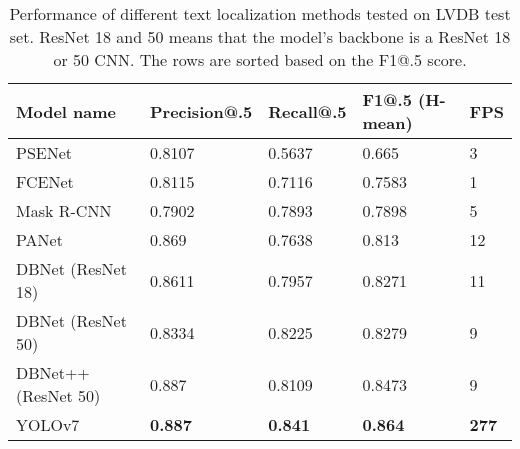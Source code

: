 \begin{table}[!ht]
    \centering
    \caption{Performance of different text localization methods tested on LVDB test set. ResNet 18 and 50 means that the model's backbone is a ResNet 18 or 50 CNN. The rows are sorted based on the F1@.5 score.}
    \begin{tabular}{|l|l|l|l|l|}
    \hline
        Model name & Precision@.5 & Recall@.5 & F1@.5 (H-mean) & FPS \\ \hline
        PSENet & 0.8107 & 0.5637 & 0.665 & 3 \\ \hline
        FCENet & 0.8115 & 0.7116 & 0.7583 & 1 \\ \hline
        Mask R-CNN & 0.7902 & 0.7893 & 0.7898 & 5 \\ \hline
        PANet & 0.869 & 0.7638 & 0.813 & 12 \\ \hline
        DBNet (ResNet 18) & 0.8611 & 0.7957 & 0.8271 & 11 \\ \hline
        DBNet (ResNet 50) & 0.8334 & 0.8225 & 0.8279 & 9 \\ \hline
        DBNet++ (ResNet 50) & 0.887 & 0.8109 & 0.8473 & 9 \\ \hline
        YOLOv7 & \textbf{0.887} & \textbf{0.841} & \textbf{0.864} & \textbf{277} \\ \hline
    \end{tabular}
    \label{tab:text_loc_results}
\end{table}